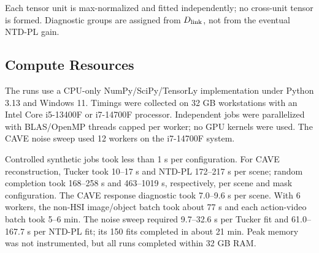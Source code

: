 Each tensor unit is max-normalized and fitted independently; no cross-unit
tensor is formed. Diagnostic groups are assigned from \(D_{\mathrm{link}}\), not from the
eventual NTD-PL gain.

\subsection{Compute Resources}
\label{supp:compute-resources}

The runs use a CPU-only NumPy/SciPy/TensorLy implementation under Python 3.13
and Windows 11. Timings were collected on 32 GB workstations with an Intel Core
i5-13400F or i7-14700F processor. Independent jobs were parallelized with
BLAS/OpenMP threads capped per worker; no GPU kernels were used. The
CAVE noise sweep used 12 workers on the i7-14700F system.

Controlled synthetic jobs took less than 1 s per configuration. For
CAVE reconstruction, Tucker took 10--17 s and NTD-PL 172--217 s per scene;
random completion took 168--258 s and 463--1019 s, respectively, per scene and
mask configuration. The CAVE response diagnostic took 7.0--9.6 s per scene.
With 6 workers, the non-HSI image/object batch took about 77 s and each
action-video batch took 5--6 min. The noise sweep required
9.7--32.6 s per Tucker fit and 61.0--167.7 s per NTD-PL fit; its 150 fits
completed in about 21 min. Peak memory was not instrumented, but all runs
completed within 32 GB RAM.

